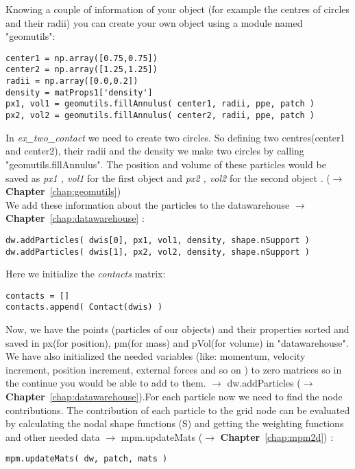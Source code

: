\documentclass[11pt,fleqn]{book} %
\begin{document}
Knowing a couple of information of your object (for example the centres of circles and their radii) you can create your own object using a module named "geomutils":
\begin{lstlisting}
center1 = np.array([0.75,0.75])
center2 = np.array([1.25,1.25])
radii = np.array([0.0,0.2])
density = matProps1['density']
px1, vol1 = geomutils.fillAnnulus( center1, radii, ppe, patch )
px2, vol2 = geomutils.fillAnnulus( center2, radii, ppe, patch )
\end{lstlisting}

In \emph{ex\_two\_contact} we need to create two circles. So defining two centres(center1 and center2), their radii and the density we make two circles by calling "geomutils.fillAnnulus". The position and volume of these particles would be saved as \emph{px1 , vol1} for the first object and \emph{px2 , vol2} for the second object . ($\rightarrow$ \textbf{Chapter}~\ref{chap:geomutils})\\
We add these information about the particles to the datawarehouse $\rightarrow$ \textbf{Chapter}~\ref{chap:datawarehouse} :
\begin{lstlisting}
dw.addParticles( dwis[0], px1, vol1, density, shape.nSupport )
dw.addParticles( dwis[1], px2, vol2, density, shape.nSupport )
\end{lstlisting}


Here we initialize the \emph{contacts} matrix:
\begin{lstlisting}
contacts = []
contacts.append( Contact(dwis) )
\end{lstlisting}

Now, we have the points (particles of our objects) and their properties sorted and saved in px(for position), pm(for mass) and pVol(for volume) in "datawarehouse". We have also initialized the needed variables (like: momentum, velocity increment, position increment, external forces and so on ) to zero matrices so in the continue you would be able to add to them. $\rightarrow$ dw.addParticles ($\rightarrow$ \textbf{Chapter}~\ref{chap:datawarehouse}).For each particle now we need to find the node contributions. The contribution of each particle to the grid node can be evaluated by calculating the nodal shape functions (S) and getting the weighting functions and other needed data $\rightarrow$ mpm.updateMats ($\rightarrow$ \textbf{Chapter}~\ref{chap:mpm2d}) :
\begin{lstlisting}
mpm.updateMats( dw, patch, mats )
\end{lstlisting}
\end{document}
